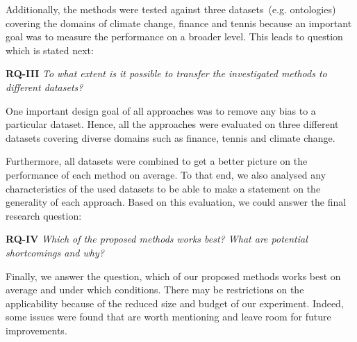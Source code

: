 Additionally, the methods were tested against three datasets~(e.g. ontologies) covering the domains of climate change, finance and tennis because an important goal was to measure the performance on a broader level. This leads to question which is stated next:
 
\textbf{RQ-III} \emph{To what extent is it possible to transfer the investigated methods to different datasets?}

One important design goal of all approaches was to remove any bias to a particular dataset. Hence, all the approaches were evaluated on three different datasets covering diverse domains such as finance, tennis and climate change. 

Furthermore, all datasets were combined to get a better picture on the performance of each method on average. To that end, we also analysed any characteristics of the used datasets to be able to make a statement on the generality of each approach. Based on this evaluation, we could answer the final research question:

\textbf{RQ-IV} \emph{Which of the proposed methods works best? What are potential shortcomings and why?}

Finally, we answer the question, which of our proposed methods works best on average and under which conditions. There may be restrictions on the applicability because of the reduced size and budget of our experiment. Indeed, some issues were found that are worth mentioning and leave room for future improvements. 



